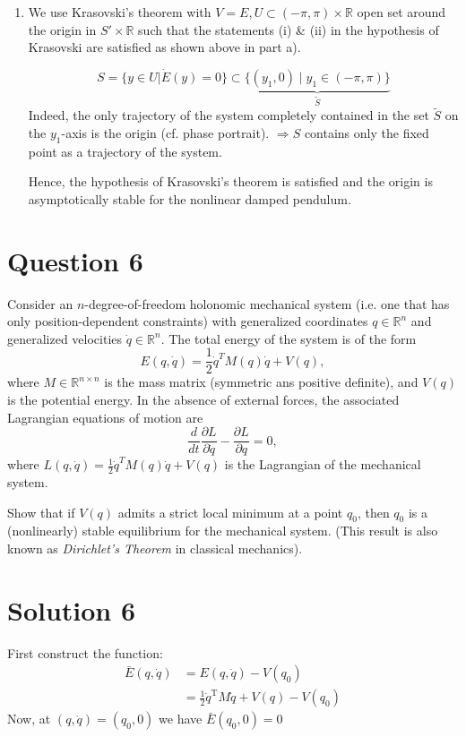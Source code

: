 \documentclass[twoside,10pt,a4paper]{article}
\begin{document}
\begin{enumerate}[label=(\alph*)]
\item We use Krasovski's theorem with $V = E, U \subset (-\pi, \pi) \times \mathbb{R}$ open set around the origin in $S' \times \mathbb{R}$ such that the statements (i) \& (ii) in the hypothesis of Krasovski are satisfied as shown above in part a).

\begin{equation}
	S = \{ y \in U \vert \dot{E}(y)=0 \} \subset \underbrace{\{ (y_1, 0) \;\vert\; y_1 \in (-\pi,\pi) \}}_{\tilde{S}}
\end{equation}
Indeed, the only trajectory of the system completely contained in the set $\tilde{S}$ on the $y_1$-axis is the origin (cf. phase portrait). $\Longrightarrow S$ contains only the fixed point as a trajectory of the system.

Hence, the hypothesis of Krasovski's theorem is satisfied and the origin is asymptotically stable for the nonlinear damped pendulum.

\end{enumerate}

\newpage

\section*{Question 6}
Consider an $n$-degree-of-freedom holonomic mechanical system (i.e. one that has only position-dependent constraints) with generalized coordinates $q\in \mathbb{R}^n$ and generalized velocities $\dot{q}\in \mathbb{R}^n$. The total energy of the system is of the form
\begin{equation*}
	E(q, \dot{q}) = \frac{1}{2} \dot{q}^T M(q)\dot{q} + V(q),
\end{equation*}
where $M \in \mathbb{R}^{n \times n}$ is the mass matrix (symmetric ans positive definite), and $V(q)$ is the potential energy. In the absence of external forces, the associated Lagrangian equations of motion are
\begin{equation*}
	\frac{d}{dt} \frac{\partial L}{\partial \dot{q}} - \frac{\partial L}{\partial q} = 0,
\end{equation*}
where $L(q, \dot{q}) = \frac{1}{2}\dot{q}^T M(q)\dot{q} + V(q)$ is the Lagrangian of the mechanical system.

Show that if $V(q)$ admits a strict local minimum at a point $q_0$, then $q_0$ is a (nonlinearly) stable equilibrium for the mechanical system. (This result is also known as \textit{Dirichlet's Theorem} in classical mechanics).

\section*{Solution 6}
First construct the function:
\begin{align*}
	\bar{E}(q, \dot{q}) &= E(q, \dot{q}) - V(q_0) \\
	&= \frac{1}{2}\dot{q}^\text{T}M\dot{q} + V(q) - V(q_0)
\end{align*}
Now, at $(q,\dot{q})=(q_0,0)$ we have $\bar{E}(q_0,0)=0$
\end{document}
